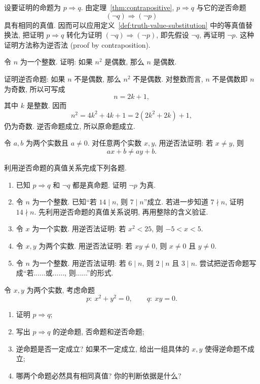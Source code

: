 \documentclass[usesamecnt, thmcnt=section, lang=cn, newtx, 10pt, scheme=chinese]{elegantbook}
\begin{document}
\begin{definition}[逆否法]
设要证明的命题为 $p\Rightarrow q$. 由定理~\ref{thm:contrapositive}, $p\Rightarrow q$ 与它的逆否命题
\[
 (\neg q)\Rightarrow(\neg p)
\]
具有相同的真值. 因而可以应用定义~\ref{def:truth-value-substitution} 中的等真值替换法, 把证明 $p\Rightarrow q$ 转化为证明 $(\neg q)\Rightarrow(\neg p)$, 即先假设 $\neg q$, 再证明 $\neg p$. 这种证明方法称为{\color{blue}逆否法 (proof by contraposition)}.
\end{definition}

\begin{example}
令 $n$ 为一个整数. 证明: 如果 $n^2$ 是偶数, 那么 $n$ 是偶数.
\end{example}

\begin{solution}
证明逆否命题: 如果 $n$ 不是偶数, 那么 $n^2$ 不是偶数. 对整数而言, $n$ 不是偶数即 $n$ 为奇数, 所以可写成
\[
 n=2k+1,
\]
其中 $k$ 是整数. 因而
\[
 n^2=4k^2+4k+1=2(2k^2+2k)+1,
\]
仍为奇数. 逆否命题成立, 所以原命题成立.
\end{solution}

\begin{exercise}
\label{ex:basic-logic-10}
令 $a,b$ 为两个实数且 $a\neq0$. 对任意两个实数 $x,y$, 用逆否法证明: 若 $x\neq y$, 则
\[
 ax+b\neq ay+b.
\]
\end{exercise}

\begin{exercise}
\label{ex:logic-11}
利用逆否命题的真值关系完成下列各题.
\begin{enumerate}[label=\rm(\arabic*)]
  \item 已知 $p\Rightarrow q$ 和 $\neg q$ 都是真命题. 证明 $\neg p$ 为真.
  \item 令 $n$ 为一个整数. 已知``若 $14\mid n$, 则 $7\mid n$''成立. 若进一步知道 $7\nmid n$, 证明 $14\nmid n$. 先利用逆否命题的真值关系说明, 再用整除的含义验证.
  \item 令 $x$ 为一个实数. 用逆否法证明: 若 $x^2<25$, 则 $-5<x<5$.
  \item 令 $x,y$ 为两个实数. 用逆否法证明: 若 $xy\neq0$, 则 $x\neq0$ 且 $y\neq0$.
  \item 令 $n$ 为一个整数. 用逆否法证明: 若 $6\mid n$, 则 $2\mid n$ 且 $3\mid n$. 尝试把逆否命题写成``若......或......, 则......''的形式.
\end{enumerate}
\end{exercise}

\begin{exercise}
\label{ex:logic-12}
令 $x,y$ 为两个实数, 考虑命题
\[
 p:\ x^2+y^2=0,
 \qquad
 q:\ xy=0.
\]
\begin{enumerate}[label=\rm(\arabic*)]
  \item 证明 $p\Rightarrow q$;
  \item 写出 $p\Rightarrow q$ 的逆命题, 否命题和逆否命题;
  \item 逆命题是否一定成立? 如果不一定成立, 给出一组具体的 $x,y$ 使得逆命题不成立;
  \item 哪两个命题必然具有相同真值? 你的判断依据是什么?
\end{enumerate}
\end{exercise}
\end{document}
